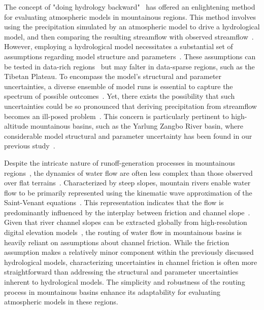 \documentclass[draft]{agujournal2019}
\begin{document}
The concept of "doing hydrology backward"~\cite{kirchner2009WRR} has offered an enlightening method for evaluating atmospheric models in mountainous regions. This method involves using the precipitation simulated by an atmospheric model to drive a hydrological model, and then comparing the resulting streamflow with observed streamflow~\cite{krier2012WRR, henn2015WRR, henn2016WRR, pang2020HESS}. However, employing a hydrological model necessitates a substantial set of assumptions regarding model structure and parameters~\cite{kirchner2009WRR, henn2016WRR}. These assumptions can be tested in data-rich regions~\cite{clark2011WRR, zheng2020JAMES} but may falter in data-sparse regions, such as the Tibetan Plateau. To encompass the model's structural and parameter uncertainties, a diverse ensemble of model runs is essential to capture the spectrum of possible outcomes~\cite{henn2015WRR, vrugt2008WRR}. Yet, there exists the possibility that such uncertainties could be so pronounced that deriving precipitation from streamflow becomes an ill-posed problem~\cite{renard2010WRR}. This concern is particularly pertinent to high-altitude mountainous basins, such as the Yarlung Zangbo River basin, where considerable model structural and parameter uncertainty has been found in our previous study~\cite{lei2024JH}.

Despite the intricate nature of runoff-generation processes in mountainous regions~\cite{van_tiel2024NW}, the dynamics of water flow are often less complex than those observed over flat terrains~\cite{getirana2013WRR, moussa1996JH}. Characterized by steep slopes, mountain rivers enable water flow to be primarily represented using the kinematic wave approximation of the Saint-Venant equations~\cite{moussa1996JH}. This representation indicates that the flow is predominantly influenced by the interplay between friction and channel slope~\cite{getirana2013WRR, moussa1996JH}. Given that river channel slopes can be extracted globally from high-resolution digital elevation models~\cite{yamazaki2017GRL, yamazaki2019WRR}, the routing of water flow in mountainous basins is heavily reliant on assumptions about channel friction. While the friction assumption makes a relatively minor component within the previously discussed hydrological models,  characterizing uncertainties in channel friction is often more straightforward than addressing the structural and parameter uncertainties inherent to hydrological models. The simplicity and robustness of the routing process in mountainous basins enhance its adaptability for evaluating atmospheric models in these regions.
\end{document}

